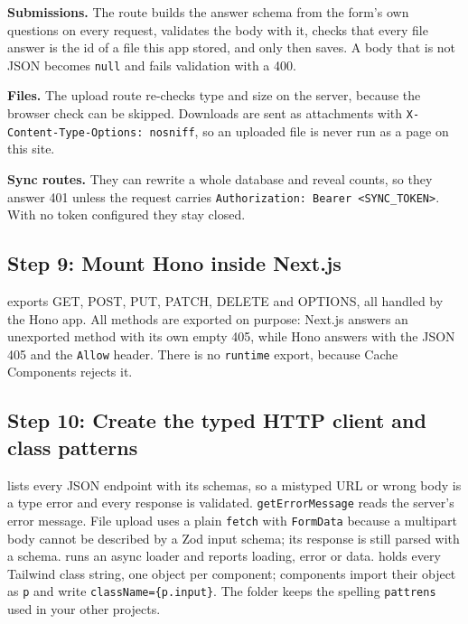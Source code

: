 \documentclass[11pt,a4paper]{article}
\begin{document}
\textbf{Submissions.} The route builds the answer schema from the form's own questions on every request, validates the body with it, checks that every file answer is the id of a file this app stored, and only then saves. A body that is not JSON becomes \texttt{null} and fails validation with a 400.

\textbf{Files.} The upload route re-checks type and size on the server, because the browser check can be skipped. Downloads are sent as attachments with \texttt{X-Content-Type-Options: nosniff}, so an uploaded file is never run as a page on this site.

\textbf{Sync routes.} They can rewrite a whole database and reveal counts, so they answer 401 unless the request carries \texttt{Authorization: Bearer <SYNC\_TOKEN>}. With no token configured they stay closed.

\subsection*{Step 9: Mount Hono inside Next.js}
 exports GET, POST, PUT, PATCH, DELETE and OPTIONS, all handled by the Hono app. All methods are exported on purpose: Next.js answers an unexported method with its own empty 405, while Hono answers with the JSON 405 and the \texttt{Allow} header. There is no \texttt{runtime} export, because Cache Components rejects it.

\subsection*{Step 10: Create the typed HTTP client and class patterns}
 lists every JSON endpoint with its schemas, so a mistyped URL or wrong body is a type error and every response is validated. \texttt{getErrorMessage} reads the server's error message. File upload uses a plain \texttt{fetch} with \texttt{FormData} because a multipart body cannot be described by a Zod input schema; its response is still parsed with a schema.  runs an async loader and reports loading, error or data.  holds every Tailwind class string, one object per component; components import their object as \texttt{p} and write \texttt{className=\{p.input\}}. The folder keeps the spelling \texttt{pattrens} used in your other projects.
\end{document}
